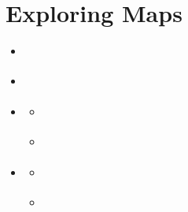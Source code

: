 \documentclass[letterpaper,10pt,english]{sphinxmanual}
\begin{document}
\section{Exploring Maps}
\label{\detokenize{en/04_exploring_maps:exploring-maps}}\label{\detokenize{en/04_exploring_maps:maps-en}}\label{\detokenize{en/04_exploring_maps::doc}}
\begin{sphinxcontents}
\begin{itemize}
\item {} 
\sphinxAtStartPar
{}\label{\detokenize{en/04_exploring_maps:id1}}{\hyperref[\detokenize{en/04_exploring_maps:finding-a-map}]{}}

\item {} 
\sphinxAtStartPar
{}\label{\detokenize{en/04_exploring_maps:id2}}{\hyperref[\detokenize{en/04_exploring_maps:the-map-viewer-interface}]{}}

\item {} 
\sphinxAtStartPar
{}\label{\detokenize{en/04_exploring_maps:id3}}{\hyperref[\detokenize{en/04_exploring_maps:navigating-the-map}]{}}
\begin{itemize}
\item {} 
\sphinxAtStartPar
{}\label{\detokenize{en/04_exploring_maps:id4}}{\hyperref[\detokenize{en/04_exploring_maps:basic-navigation}]{}}

\item {} 
\sphinxAtStartPar
{}\label{\detokenize{en/04_exploring_maps:id5}}{\hyperref[\detokenize{en/04_exploring_maps:going-to-a-specific-location}]{}}

\end{itemize}

\item {} 
\sphinxAtStartPar
{}\label{\detokenize{en/04_exploring_maps:id6}}{\hyperref[\detokenize{en/04_exploring_maps:working-with-layers}]{}}
\begin{itemize}
\item {} 
\sphinxAtStartPar
{}\label{\detokenize{en/04_exploring_maps:id7}}{\hyperref[\detokenize{en/04_exploring_maps:opening-the-layer-panel}]{}}

\item {} 
\sphinxAtStartPar
{}\label{\detokenize{en/04_exploring_maps:id8}}{\hyperref[\detokenize{en/04_exploring_maps:toggling-layer-visibility}]{}}


\end{itemize}
\end{itemize}
\end{sphinxcontents}
\end{document}
